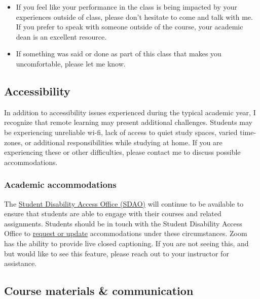 \documentclass[
]{article}
\providecommand{\tightlist}{%
  \setlength{\itemsep}{0pt}\setlength{\parskip}{0pt}}
\begin{document}
\begin{itemize}
\tightlist
\item
  If you feel like your performance in the class is being impacted by
  your experiences outside of class, please don't hesitate to come and
  talk with me. If you prefer to speak with someone outside of the
  course, your academic dean is an excellent resource.
\item
  If something was said or done as part of this class that makes you
  uncomfortable, please let me know.
\end{itemize}

\hypertarget{accessibility}{%
\subsection{Accessibility}\label{accessibility}}

In addition to accessibility issues experienced during the typical
academic year, I recognize that remote learning may present additional
challenges. Students may be experiencing unreliable wi-fi, lack of
access to quiet study spaces, varied time-zones, or additional
responsibilities while studying at home. If you are experiencing these
or other difficulties, please contact me to discuss possible
accommodations.

\hypertarget{academic-accommodations}{%
\subsubsection{Academic accommodations}\label{academic-accommodations}}

The \href{https://access.duke.edu/students}{Student Disability Access
Office (SDAO)} will continue to be available to ensure that students are
able to engage with their courses and related assignments. Students
should be in touch with the Student Disability Access Office to
\href{https://access.duke.edu/requests}{request or update}
accommodations under these circumstances. Zoom has the ability to
provide live closed captioning. If you are not seeing this, and but
would like to see this feature, please reach out to your instructor for
assistance.

\hypertarget{course-materials-communication}{%
\subsection{Course materials \&
communication}\label{course-materials-communication}}
\end{document}
